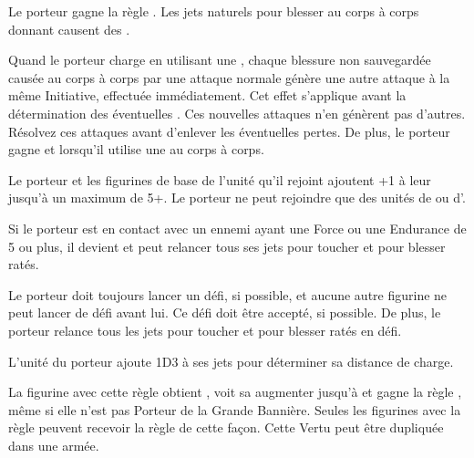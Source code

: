 \begin{multicols}{2}\raggedcolumns

\startpricelist

 Le porteur gagne la règle . Les jets naturels pour blesser au corps à corps donnant  causent des \multiplewounds{\ordnance}{}.

 Quand le porteur charge en utilisant une \lance{}, chaque blessure non sauvegardée causée au corps à corps par une attaque normale génère une autre attaque à la même Initiative, effectuée immédiatement. Cet effet s'applique avant la détermination des éventuelles \multiplewounds{}{}. Ces nouvelles attaques n'en génèrent pas d'autres. Résolvez ces attaques avant d'enlever les éventuelles pertes. De plus, le porteur gagne \devastatingcharge{} et \thunderouscharge{} lorsqu'il utilise une \lance{} au corps à corps.

 Le porteur et les figurines de base de l'unité qu'il rejoint ajoutent +1 à leur \wardsave{} jusqu'à un maximum de 5+. Le porteur ne peut rejoindre que des unités de \cavalry{} ou d'\infantry{}.

 Si le porteur est en contact avec un ennemi ayant une Force ou une Endurance de 5 ou plus, il devient \stubborn{} et peut relancer tous ses jets pour toucher et pour blesser ratés.

 Le porteur doit toujours lancer un défi, si possible, et aucune autre figurine ne peut lancer de défi avant lui. Ce défi doit être accepté, si possible. De plus, le porteur relance tous les jets pour toucher et pour blesser ratés en défi.

 L'unité du porteur ajoute 1D3 à ses jets pour déterminer sa distance de charge.

 La figurine avec cette règle obtient \insignificant{}, voit sa \inspiringpresence{} augmenter jusqu'à  et gagne la règle \holdyourground{}, même si elle n'est pas Porteur de la Grande Bannière. Seules les figurines avec la règle \insignificant{} peuvent recevoir la règle \holdyourground{} de cette façon. Cette Vertu peut être dupliquée dans une armée.

\endpricelist

\end{multicols}

\closearmynewsection

